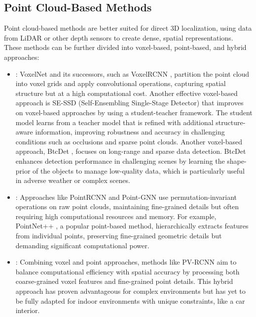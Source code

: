 \subsection{Point Cloud-Based Methods}
Point cloud-based methods are better suited for direct 3D localization, 
using data from LiDAR or other depth sensors to create dense, spatial 
representations. These methods can be further divided into voxel-based, 
point-based, and hybrid approaches:
\begin{itemize}
    \item {}: VoxelNet \cite{voxelnet} 
    and its successors, such as VoxelRCNN \cite{voxelrcnn}, 
    partition the point cloud into voxel grids and apply convolutional 
    operations, capturing spatial structure but at a high computational 
    cost. Another effective voxel-based approach is 
    SE-SSD (Self-Ensembling Single-Stage Detector) \cite{se_ssd} 
    that improves on voxel-based approaches by using a student-teacher 
    framework. The student model learns from a teacher model that is 
    refined with additional structure-aware information, improving 
    robustness and accuracy in challenging conditions such as occlusions 
    and sparse point clouds. Another voxel-based approach, 
    BtcDet \cite{bdc_det}, focuses on long-range and sparse 
    data detection. BtcDet enhances detection performance in challenging 
    scenes by learning the shape-prior of the objects to manage low-quality data, 
    which is particularly useful in adverse weather or complex scenes.
    \item {}: Approaches like 
    PointRCNN \cite{point_rcnn} and 
    Point-GNN \cite{point_gnn} use permutation-invariant 
    operations on raw point clouds, maintaining fine-grained details 
    but often requiring high computational resources and memory. 
    For example, PointNet++ \cite{pointnet++} , 
    a popular point-based method, hierarchically extracts features 
    from individual points, preserving fine-grained geometric details 
    but demanding significant computational power.
    \item {}: Combining voxel and point approaches, 
    methods like PV-RCNN \cite{pv_rcnn} aim to balance 
    computational efficiency with spatial accuracy by processing both 
    coarse-grained voxel features and fine-grained point details. 
    This hybrid approach has proven advantageous for complex environments but 
    has yet to be fully adapted for indoor environments with unique constraints, 
    like a car interior.
\end{itemize}


